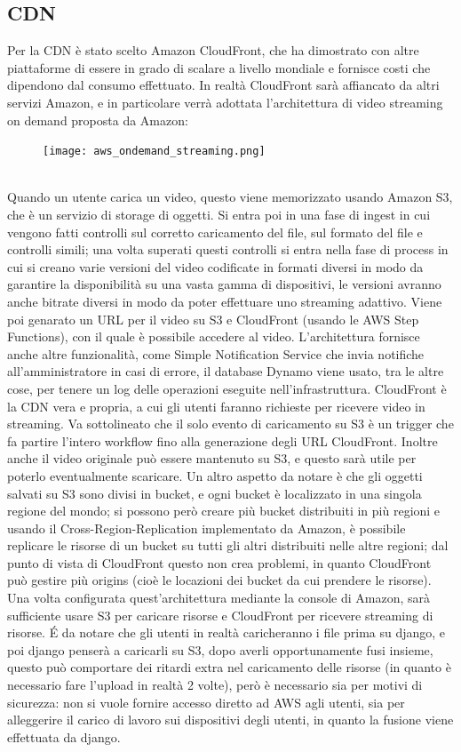 \subsection{CDN}
Per la CDN è stato scelto Amazon CloudFront, che ha dimostrato con altre piattaforme di essere in grado di scalare a livello mondiale e fornisce costi che dipendono dal consumo effettuato. In realtà CloudFront sarà affiancato da altri servizi Amazon, e in particolare verrà adottata l'architettura di video streaming on demand proposta da Amazon:\\
\begin{figure}[!h]
\centering
\texttt{[image: aws\_ondemand\_streaming.png]}
\end{figure}\\
Quando un utente carica un video, questo viene memorizzato usando Amazon S3, che è un servizio di storage di oggetti. Si entra poi in una fase di ingest in cui vengono fatti controlli sul corretto caricamento del file, sul formato del file e controlli simili; una volta superati questi controlli si entra nella fase di process in cui si creano varie versioni del video codificate in formati diversi in modo da garantire la disponibilità su una vasta gamma di dispositivi, le versioni avranno anche bitrate diversi in modo da poter effettuare uno streaming adattivo. Viene poi genarato un URL per il video su S3 e CloudFront (usando le AWS Step Functions), con il quale è possibile accedere al video. L'architettura fornisce anche altre funzionalità, come Simple Notification Service che invia notifiche all'amministratore in casi di errore, il database Dynamo viene usato, tra le altre cose, per tenere un log delle operazioni eseguite nell'infrastruttura. CloudFront è la CDN vera e propria, a cui gli utenti faranno richieste per ricevere video in streaming. Va sottolineato che il solo evento di caricamento su S3 è un trigger che fa partire l'intero workflow fino alla generazione degli URL CloudFront. Inoltre anche il video originale può essere mantenuto su S3, e questo sarà utile per poterlo eventualmente scaricare. Un altro aspetto da notare è che gli oggetti salvati su S3 sono divisi in bucket, e ogni bucket è localizzato in una singola regione del mondo; si possono però creare più bucket distribuiti in più regioni e usando il Cross-Region-Replication implementato da Amazon, è possibile replicare le risorse di un bucket su tutti gli altri distribuiti nelle altre regioni; dal punto di vista di CloudFront questo non crea problemi, in quanto CloudFront può gestire più origins (cioè le locazioni dei bucket da cui prendere le risorse).\\
Una volta configurata quest'architettura mediante la console di Amazon, sarà sufficiente usare S3 per caricare risorse e CloudFront per ricevere streaming di risorse. \'E da notare che gli utenti in realtà caricheranno i file prima su django, e poi django penserà a caricarli su S3, dopo averli opportunamente fusi insieme, questo può comportare dei ritardi extra nel caricamento delle risorse (in quanto è necessario fare l'upload in realtà 2 volte), però è necessario sia per motivi di sicurezza: non si vuole fornire accesso diretto ad AWS agli utenti, sia per alleggerire il carico di lavoro sui dispositivi degli utenti, in quanto la fusione viene effettuata da django.
